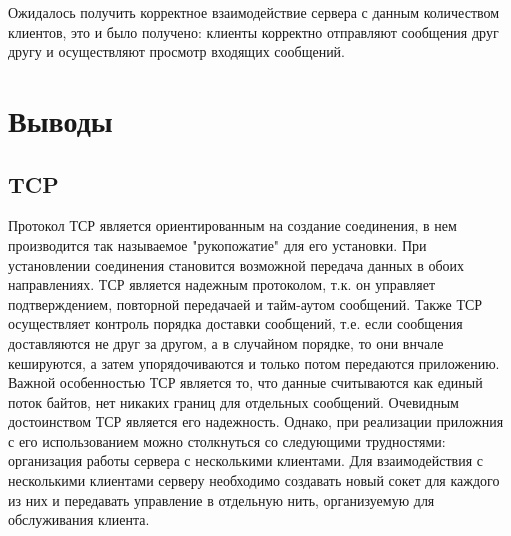 \documentclass[12pt,a4paper]{report}
\begin{document}
Ожидалось получить корректное взаимодействие сервера с данным количеством клиентов, это и было получено: клиенты корректно отправляют сообщения друг другу и осуществляют просмотр входящих сообщений.
\chapter{Выводы}
\section{TCP}
Протокол ТСР является ориентированным на создание соединения, в нем производится так называемое "рукопожатие" для его установки. При установлении соединения становится возможной передача данных в обоих направлениях.
\linebreak
ТСР является надежным протоколом, т.к. он управляет подтверждением, повторной передачаей и тайм-аутом сообщений. Также ТСР осуществляет контроль порядка доставки сообщений, т.е. если сообщения доставляются не друг за другом, а в случайном порядке, то они внчале кешируются, а затем упорядочиваются и только потом передаются приложению.
Важной особенностью ТСР является то, что данные считываются как единый поток байтов, нет никаких границ для отдельных сообщений.
Очевидным достоинством ТСР является его надежность. Однако, при реализации приложния с его использованием можно столкнуться со следующими трудностями: организация работы сервера с несколькими клиентами. Для взаимодействия с несколькими клиентами серверу необходимо создавать новый сокет для каждого из них и передавать управление в отдельную нить, организуемую для обслуживания клиента.
\end{document}
